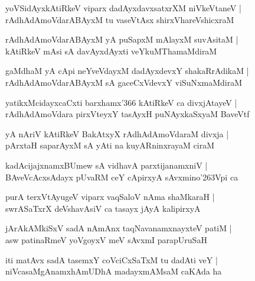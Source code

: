 \begin{shloka}
yoVSidAyxkAtiRkeV viparx dadAyxdavxsatxrXM niVkeVtaneV |\\
rAdhAdAmoVdarABAyxM tu vaseVtAsx shirxVhareVshicxraM 
\end{shloka}

\begin{shloka}
rAdhAdAmoVdarABAyxM yA puSapxM mAlayxM suvAsitaM |\\
kAtiRkeV mAsi sA davAyxdAyxti veYkuMThamaMdiraM 
\end{shloka}

\begin{shloka}
gaMdhaM yA cApi neYveVdayxM dadAyxdevxY shakaRrAdikaM |\\
rAdhAdAmoVdarABAyxM sA gaceCxVdevxY viSuNxmaMdiraM 
\end{shloka}

\begin{shloka}
yatikxMcidayxcaCxti barxhamx\char'366 kAtiRkeV ca divxjAtayeV |\\
rAdhAdAmoVdara pirxVteyxY tasAyxH puNAyxkaSxyaM BaveVtf
\end{shloka}

\begin{shloka}
yA nAriV kAtiRkeV BakAtxyX rAdhAdAmoVdaraM divxja |\\
pArxtaH saparAyxM sA yAti na kuyARninxrayaM ciraM
\end{shloka}

\begin{shloka}
kadAcijajxnamxBUmew sA vidhavA parxtijanamxniV |\\
BAveVcAcxsAdayx pUvaRM ceY cApirxyA sAvxmino\char'263Vpi ca 
\end{shloka}

\begin{shloka}
purA terxVtAyugeV viparx vaqSaloV nAma shaMkaraH |\\
swrASaTxrX deVshavAsiV ca tasayx jAyA kalipirxyA
\end{shloka}

\begin{shloka}
jArAkAMkiSxV sadA nAmAnx taqNavanamxnayxteV patiM |\\
asw patinaRmeV yoVgoyxV meV sAvxmI parapUruSaH
\end{shloka}

\begin{shloka}
iti matAvx sadA tasemxY coVciCxSaTxM tu dadAti veY |\\
niVcasaMgAnamxhAmUDhA madayxmAMsaM caKAda ha
\end{shloka}

